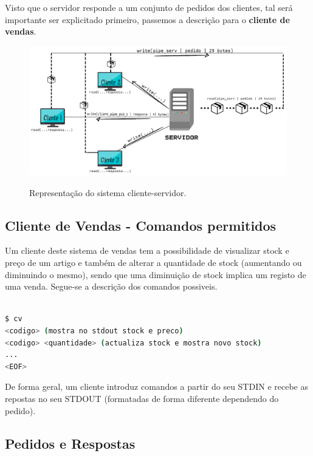 \documentclass[a4paper,11pt]{report}
\begin{document}
Visto que o servidor responde a um conjunto de pedidos dos clientes, tal será importante ser explicitado primeiro, passemos a descrição para o \textbf{cliente de vendas}.

\vspace{1.5cm}

\begin{figure}[h]
    \centering
    \includegraphics[scale=0.5]{cliente_server.png}
    \label{img:serverclient}
    \caption{Representação do sistema cliente-servidor.}
\end{figure}

\subsection{Cliente de Vendas - Comandos permitidos}

\hspace{0.50cm} Um cliente deste sistema de vendas tem a possibilidade de visualizar stock e preço de um artigo e também de alterar a quantidade de stock (aumentando ou diminuindo o mesmo), sendo que uma diminuição de stock implica um registo de uma venda. Segue-se a descrição dos comandos possiveis.

\begin{lstlisting}[language=bash]

$ cv
<codigo> (mostra no stdout stock e preco)
<codigo> <quantidade> (actualiza stock e mostra novo stock)
...
<EOF>

\end{lstlisting}
   
De forma geral, um cliente introduz comandos a partir do seu STDIN e recebe as repostas no seu STDOUT (formatadas de forma diferente dependendo do pedido).

\subsection{Pedidos e Respostas}
   
\end{document}

